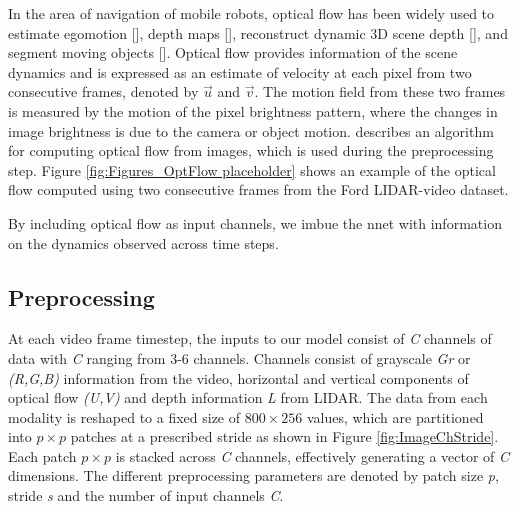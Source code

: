 \documentclass{article}
\begin{document}
In the area of navigation of mobile robots, optical flow has been widely used to estimate egomotion [\cite{Prazdny1980-egomotion-OF}], depth maps [\cite{Shahraray1988-depthestimation-OF}], reconstruct dynamic 3D scene depth [\cite{Yang2012-reconstruction-OF}], and segment moving objects [\cite{Shao2002-seg-OF}]. Optical flow provides information of the scene dynamics and is expressed as an estimate of velocity at each pixel from two consecutive frames, denoted by $\vec{u}$ and $\vec{v}$. The motion field from these two frames is measured by the motion of the pixel brightness pattern, where the changes in image brightness is due to the camera or object motion. \cite{Liu2009Beyond-Pix} describes an algorithm for computing optical flow from images, which is used during the preprocessing step. Figure \ref{fig:Figures_OptFlow placeholder} shows an example of the optical flow computed using two consecutive frames from the Ford LIDAR-video dataset.

By including optical flow as input channels, we imbue the nnet with information on the dynamics observed across time steps.




\subsection{Preprocessing} %
\label{sub:preprocessing}
At each video frame timestep, the inputs to our model consist of \emph{C} channels of data with \emph{C} ranging from 3-6 channels. Channels consist of grayscale \emph{Gr} or \emph{(R,G,B)} information from the video, horizontal and vertical components of optical flow \emph{(U,V)} and depth information \emph{L} from LIDAR. The data from each modality is reshaped to a fixed size of $800\times256$ values, which are partitioned into $p\times p$ patches at a prescribed stride as shown in Figure \ref{fig:ImageChStride}. Each patch $p\times p$ is stacked across \emph{C} channels, effectively generating a vector of \emph{C} dimensions. The different preprocessing parameters are denoted by patch size \emph{p}, stride \emph{s} and the number of input channels \emph{C}.
\end{document}
